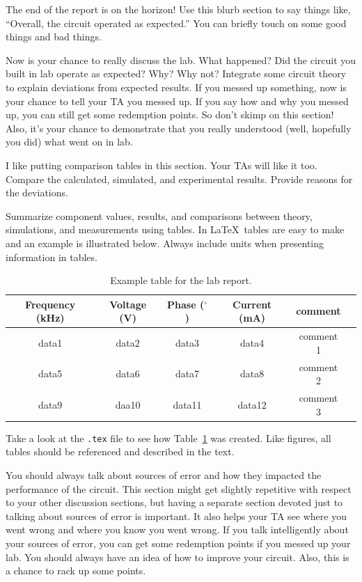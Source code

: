 \documentclass[11pt]{article}
\begin{document}
The end of the report is on the horizon! Use this blurb section to say things like, “Overall, the circuit operated as expected.” You can briefly touch on some good things and bad things.

Now is your chance to really discuss the lab. What happened? Did the circuit you built in lab operate as expected? Why? Why not? Integrate some circuit theory to explain deviations from expected results. If you messed up something, now is your chance to tell your TA you messed up. If you say how and why you messed up, you can still get some redemption points. So don’t skimp on this section! Also, it’s your chance to demonstrate that you really understood (well, hopefully you did) what went on in lab.

I like putting comparison tables in this section. Your TAs will like it too. Compare the calculated, simulated, and experimental results. Provide reasons for the deviations.

Summarize component values, results, and comparisons between theory, simulations, and measurements using tables.  In \LaTeX\, tables are easy to make and an example is illustrated below.  Always include units when presenting information in tables.

\begin{table}[ht]
\centering
\caption{Example table for the lab report.}
\begin{tabular}{ |c|c|c|c|c|p{2in}| } 
 \hline\hline
 Frequency (kHz) & Voltage (V) & Phase ($^\circ$) & Current (mA) & comment  \\\hline\hline 
 data1 & data2 & data3 & data4 & comment 1 \\ \hline
 data5 & data6 & data7 & data8 & comment 2\\ \hline
 data9  & daa10 & data11 & data12 & comment 3\\ 
 \hline\hline
\end{tabular}
\label{table_ex}
\end{table}

Take a look at the {\tt .tex} file to see how Table~\ref{table_ex} was created. Like figures, all tables should be referenced and described in the text.

You should always talk about sources of error and how they impacted the performance of the circuit. This section might get slightly repetitive with respect to your other discussion sections, but having a separate section devoted just to talking about sources of error is important. It also helps your TA see where you went wrong and where you know you went wrong. If you talk intelligently about your sources of error, you can get some redemption points if you messed up your lab. You should always have an idea of how to improve your circuit. Also, this is a chance to rack up some points.
\end{document}
